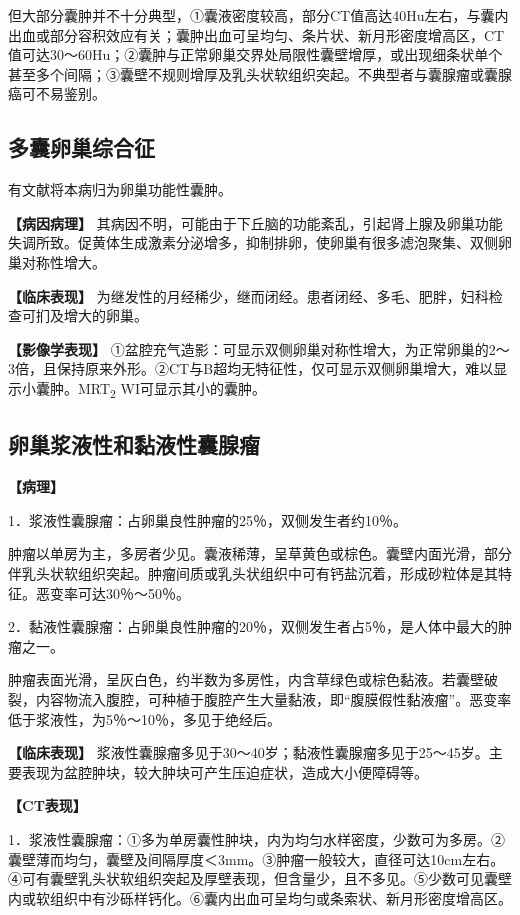 但大部分囊肿并不十分典型，①囊液密度较高，部分CT值高达40Hu左右，与囊内出血或部分容积效应有关；囊肿出血可呈均匀、条片状、新月形密度增高区，CT值可达30～60Hu；②囊肿与正常卵巢交界处局限性囊壁增厚，或出现细条状单个甚至多个间隔；③囊壁不规则增厚及乳头状软组织突起。不典型者与囊腺瘤或囊腺癌可不易鉴别。

\subsection{多囊卵巢综合征}

有文献将本病归为卵巢功能性囊肿。

\textbf{【病因病理】}
其病因不明，可能由于下丘脑的功能紊乱，引起肾上腺及卵巢功能失调所致。促黄体生成激素分泌增多，抑制排卵，使卵巢有很多滤泡聚集、双侧卵巢对称性增大。

\textbf{【临床表现】}
为继发性的月经稀少，继而闭经。患者闭经、多毛、肥胖，妇科检查可扪及增大的卵巢。

\textbf{【影像学表现】}
①盆腔充气造影：可显示双侧卵巢对称性增大，为正常卵巢的2～3倍，且保持原来外形。②CT与B超均无特征性，仅可显示双侧卵巢增大，难以显示小囊肿。MRT\textsubscript{2}
WI可显示其小的囊肿。

\subsection{卵巢浆液性和黏液性囊腺瘤}

\textbf{【病理】}

1．浆液性囊腺瘤：占卵巢良性肿瘤的25％，双侧发生者约10％。

肿瘤以单房为主，多房者少见。囊液稀薄，呈草黄色或棕色。囊壁内面光滑，部分伴乳头状软组织突起。肿瘤间质或乳头状组织中可有钙盐沉着，形成砂粒体是其特征。恶变率可达30％～50％。

2．黏液性囊腺瘤：占卵巢良性肿瘤的20％，双侧发生者占5％，是人体中最大的肿瘤之一。

肿瘤表面光滑，呈灰白色，约半数为多房性，内含草绿色或棕色黏液。若囊壁破裂，内容物流入腹腔，可种植于腹腔产生大量黏液，即“腹膜假性黏液瘤”。恶变率低于浆液性，为5％～10％，多见于绝经后。

\textbf{【临床表现】}
浆液性囊腺瘤多见于30～40岁；黏液性囊腺瘤多见于25～45岁。主要表现为盆腔肿块，较大肿块可产生压迫症状，造成大小便障碍等。

\textbf{【CT表现】}

1．浆液性囊腺瘤：①多为单房囊性肿块，内为均匀水样密度，少数可为多房。②囊壁薄而均匀，囊壁及间隔厚度＜3mm。③肿瘤一般较大，直径可达10cm左右。④可有囊壁乳头状软组织突起及厚壁表现，但含量少，且不多见。⑤少数可见囊壁内或软组织中有沙砾样钙化。⑥囊内出血可呈均匀或条索状、新月形密度增高区。

